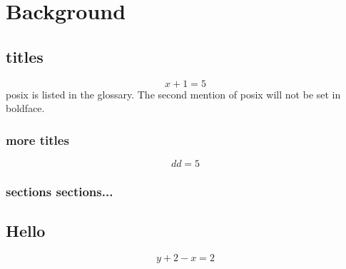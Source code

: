 %
%
%

\chapter{Background}
\label{Background}


\section{titles}
\begin{equation}
  x+1=5
\end{equation}
\gls{posix} is listed in the glossary. The second mention of \Gls{posix} will
not be set in boldface.

  \subsection{more titles}
  \begin{equation}
    dd=5
  \end{equation}
  \cite{natarajan2005klu}
  \subsection{sections sections...}
  \cite{2018arXiv180503648K}
  \cite{10.5555/2685817}

\section{Hello}
\begin{equation}
  y+2-x=2
\end{equation}
